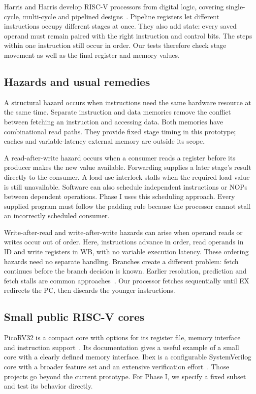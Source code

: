 \documentclass[conference]{IEEEtran}
\begin{document}
Harris and Harris develop RISC-V processors from digital logic, covering single-cycle, multi-cycle and pipelined designs~\cite{harris}. Pipeline registers let different instructions occupy different stages at once. They also add state: every saved operand must remain paired with the right instruction and control bits. The steps within one instruction still occur in order. Our tests therefore check stage movement as well as the final register and memory values.

\subsection{Hazards and usual remedies}
A structural hazard occurs when instructions need the same hardware resource at the same time. Separate instruction and data memories remove the conflict between fetching an instruction and accessing data. Both memories have combinational read paths. They provide fixed stage timing in this prototype; caches and variable-latency external memory are outside its scope.

A read-after-write hazard occurs when a consumer reads a register before its producer makes the new value available. Forwarding supplies a later stage's result directly to the consumer. A load-use interlock stalls when the required load value is still unavailable. Software can also schedule independent instructions or NOPs between dependent operations. Phase I uses this scheduling approach. Every supplied program must follow the padding rule because the processor cannot stall an incorrectly scheduled consumer.

Write-after-read and write-after-write hazards can arise when operand reads or writes occur out of order. Here, instructions advance in order, read operands in ID and write registers in WB, with no variable execution latency. These ordering hazards need no separate handling. Branches create a different problem: fetch continues before the branch decision is known. Earlier resolution, prediction and fetch stalls are common approaches~\cite{patterson,harris}. Our processor fetches sequentially until EX redirects the PC, then discards the younger instructions.

\subsection{Small public RISC-V cores}
PicoRV32 is a compact core with options for its register file, memory interface and instruction support~\cite{pico}. Its documentation gives a useful example of a small core with a clearly defined memory interface. Ibex is a configurable SystemVerilog core with a broader feature set and an extensive verification effort~\cite{ibex}. Those projects go beyond the current prototype. For Phase I, we specify a fixed subset and test its behavior directly.
\end{document}
